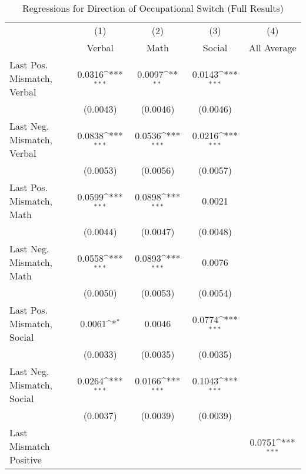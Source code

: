 {
\def\sym#1{\ifmmode^{#1}\else\(^{#1}\)\fi}
\begin{longtable}{l*{4}{c}}
\caption{Regressions for Direction of Occupational Switch (Full Results)}\\
\hline  \endfirsthead\hline  \endhead\hline  \endfoot\endlastfoot
                    &\multicolumn{1}{c}{(1)}&\multicolumn{1}{c}{(2)}&\multicolumn{1}{c}{(3)}&\multicolumn{1}{c}{(4)}\\
                    &\multicolumn{1}{c}{Verbal}&\multicolumn{1}{c}{Math}&\multicolumn{1}{c}{Social}&\multicolumn{1}{c}{All Average}\\
\hline  
Last Pos. Mismatch, Verbal&      0.0316\sym{***}&      0.0097\sym{**} &      0.0143\sym{***}&                     \\
                    &    (0.0043)         &    (0.0046)         &    (0.0046)         &                     \\
Last Neg. Mismatch, Verbal&      0.0838\sym{***}&      0.0536\sym{***}&      0.0216\sym{***}&                     \\
                    &    (0.0053)         &    (0.0056)         &    (0.0057)         &                     \\
Last Pos. Mismatch, Math&      0.0599\sym{***}&      0.0898\sym{***}&      0.0021         &                     \\
                    &    (0.0044)         &    (0.0047)         &    (0.0048)         &                     \\
Last Neg. Mismatch, Math&      0.0558\sym{***}&      0.0893\sym{***}&      0.0076         &                     \\
                    &    (0.0050)         &    (0.0053)         &    (0.0054)         &                     \\
Last Pos. Mismatch, Social&      0.0061\sym{*}  &      0.0046         &      0.0774\sym{***}&                     \\
                    &    (0.0033)         &    (0.0035)         &    (0.0035)         &                     \\
Last Neg. Mismatch, Social&      0.0264\sym{***}&      0.0166\sym{***}&      0.1043\sym{***}&                     \\
                    &    (0.0037)         &    (0.0039)         &    (0.0039)         &                     \\
Last Mismatch Positive&                     &                     &                     &      0.0751\sym{***}\\

\end{longtable}}
